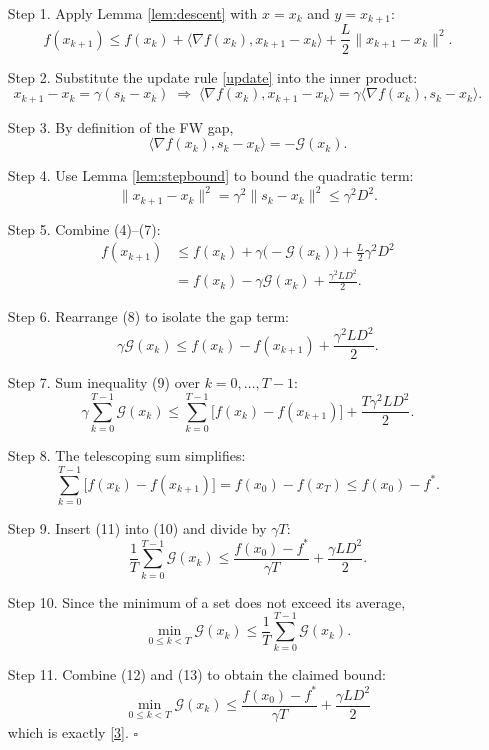 \documentclass{article}
\newcommand{\grad}{\nabla}
\newcommand{\gap}{\mathcal{G}}
\newcommand{\inner}[2]{\langle #1,#2\rangle}
\begin{document}
\begin{enumerate}
\item[Step 1.] Apply Lemma \ref{lem:descent} with $x=x_{k}$ and $y=x_{k+1}$:
\[
f(x_{k+1})\le f(x_{k})+\inner{\grad f(x_{k})}{x_{k+1}-x_{k}}
               +\frac{L}{2}\|x_{k+1}-x_{k}\|^{2}.
\tag{4}
\]

\item[Step 2.] Substitute the update rule \eqref{update} into the inner product:
\[
x_{k+1}-x_{k}= \gamma(s_{k}-x_{k})\;\Rightarrow\;
\inner{\grad f(x_{k})}{x_{k+1}-x_{k}}
   =\gamma\inner{\grad f(x_{k})}{s_{k}-x_{k}}.
\tag{5}
\]

\item[Step 3.] By definition of the FW gap,
\[
\inner{\grad f(x_{k})}{s_{k}-x_{k}}
   = -\gap(x_{k}).
\tag{6}
\]

\item[Step 4.] Use Lemma \ref{lem:stepbound} to bound the quadratic term:
\[
\|x_{k+1}-x_{k}\|^{2}= \gamma^{2}\|s_{k}-x_{k}\|^{2}
                    \le \gamma^{2} D^{2}.
\tag{7}
\]

\item[Step 5.] Combine (4)–(7):
\[
\begin{aligned}
f(x_{k+1})
&\le f(x_{k}) + \gamma\bigl(-\gap(x_{k})\bigr)
   +\frac{L}{2}\gamma^{2}D^{2}\\[2mm]
&= f(x_{k}) -\gamma\gap(x_{k}) +\frac{\gamma^{2}L D^{2}}{2}.
\end{aligned}
\tag{8}
\]

\item[Step 6.] Rearrange (8) to isolate the gap term:
\[
\gamma\gap(x_{k})
\le f(x_{k})-f(x_{k+1}) +\frac{\gamma^{2}L D^{2}}{2}.
\tag{9}
\]

\item[Step 7.] Sum inequality (9) over $k=0,\dots,T-1$:
\[
\gamma\sum_{k=0}^{T-1}\gap(x_{k})
\le \sum_{k=0}^{T-1}\bigl[f(x_{k})-f(x_{k+1})\bigr]
   +\frac{T\gamma^{2}L D^{2}}{2}.
\tag{10}
\]

\item[Step 8.] The telescoping sum simplifies:
\[
\sum_{k=0}^{T-1}\bigl[f(x_{k})-f(x_{k+1})\bigr]
= f(x_{0})-f(x_{T})\le f(x_{0})-f^{*}.
\tag{11}
\]

\item[Step 9.] Insert (11) into (10) and divide by $\gamma T$:
\[
\frac{1}{T}\sum_{k=0}^{T-1}\gap(x_{k})
\le \frac{f(x_{0})-f^{*}}{\gamma T}
   +\frac{\gamma L D^{2}}{2}.
\tag{12}
\]

\item[Step 10.] Since the minimum of a set does not exceed its average,
\[
\min_{0\le k<T}\gap(x_{k})
\le\frac{1}{T}\sum_{k=0}^{T-1}\gap(x_{k}).
\tag{13}
\]

\item[Step 11.] Combine (12) and (13) to obtain the claimed bound:
\[
\boxed{\;
\min_{0\le k<T}\gap(x_{k})
\le \frac{f(x_{0})-f^{*}}{\gamma T}
   +\frac{\gamma L D^{2}}{2}\;}
\tag{14}
\]
which is exactly \eqref{3}.  $\square$
\end{enumerate}
\end{document}
